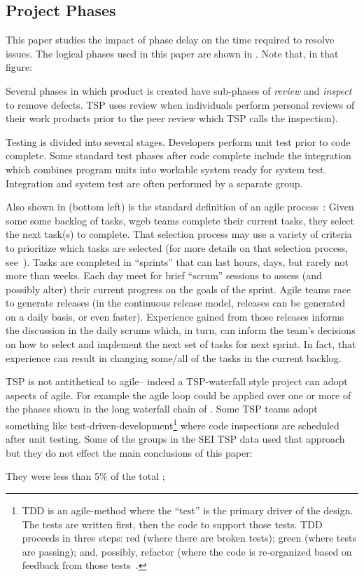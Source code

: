 \subsection{Project Phases}
This paper studies the impact of phase delay on the time required to resolve issues.
The logical phases used in this paper are shown in . Note that, in that figure:
\bi 
\item
Several  phases in which product is created have sub-phases of {\em review} and {\em inspect} to remove defects. TSP uses review when individuals perform personal reviews of their work products prior to the peer review which TSP calls the inspection).
\item Testing is divided into several stages. Developers perform unit test prior to code complete. Some standard test phases after code complete include the integration which combines program units into workable system ready for system test. Integration and system test are often performed by a separate group.

\ei 

Also shown in  (bottom left) is the standard definition of an agile process~\cite{boehmturner03}:
Given some
some backlog of tasks, wgeb teams complete their current tasks, they select the next task(s) to complete. That selection process may use a variety of criteria
to prioritize which  tasks are selected (for more details on that selection process, see~\cite{me09j,port08,boehmturner03}). Tasks are completed in ``sprints'' that can last hours,
days, but rarely not more than weeks. Each day meet for brief ``scrum'' sessions to assess (and possibly alter) their current progress on the goals of the sprint.  
Agile teams race to generate releases
(in the continuous release model, releases can be generated on a daily basis, or even faster).  
Experience gained from those releases informs the discussion in the daily scrums which, in turn,
can inform the team's decisions on how to select and implement the next set of tasks for next sprint.
In fact, that experience can result in changing some/all of the tasks in the current backlog. 

TSP is not antithetical to agile--  indeed a TSP-waterfall style project can adopt aspects
of agile.  For example the agile loop  could be applied
over one or more of the phases shown in the long waterfall chain of . Some
TSP teams adopt something like test-driven-development\footnote{TDD is an agile-method
where the ``test'' is the primary driver of the design. The tests are written first,
then the code to support those tests. TDD proceeds in three steps: red (where there
are broken tests); green (where tests are passing); and, possibly, refactor (where
the code is re-organized based on feedback from those tests~\cite{fraser03}.} where
code inspections are scheduled after unit testing. Some of the groups in the SEI TSP data used that approach but
they do not effect the main conclusions of this paper:
\bi 
\item They were less than 5\% of the total ;

